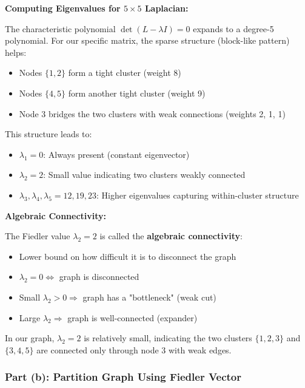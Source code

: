 \documentclass[12pt]{article}
\begin{document}
\begin{explanation}
\textbf{Computing Eigenvalues for $5 \times 5$ Laplacian:}

The characteristic polynomial $\det(L - \lambda I) = 0$ expands to a degree-5 polynomial. For our specific matrix, the sparse structure (block-like pattern) helps:

\begin{itemize}
    \item Nodes $\{1, 2\}$ form a tight cluster (weight 8)
    \item Nodes $\{4, 5\}$ form another tight cluster (weight 9)
    \item Node 3 bridges the two clusters with weak connections (weights 2, 1, 1)
\end{itemize}

This structure leads to:
\begin{itemize}
    \item $\lambda_1 = 0$: Always present (constant eigenvector)
    \item $\lambda_2 = 2$: Small value indicating two clusters weakly connected
    \item $\lambda_3, \lambda_4, \lambda_5 = 12, 19, 23$: Higher eigenvalues capturing within-cluster structure
\end{itemize}

\textbf{Algebraic Connectivity:}

The Fiedler value $\lambda_2 = 2$ is called the \textbf{algebraic connectivity}:
\begin{itemize}
    \item Lower bound on how difficult it is to disconnect the graph
    \item $\lambda_2 = 0 \Leftrightarrow$ graph is disconnected
    \item Small $\lambda_2 > 0 \Rightarrow$ graph has a "bottleneck" (weak cut)
    \item Large $\lambda_2 \Rightarrow$ graph is well-connected (expander)
\end{itemize}

In our graph, $\lambda_2 = 2$ is relatively small, indicating the two clusters $\{1,2,3\}$ and $\{3,4,5\}$ are connected only through node 3 with weak edges.

\end{explanation}

\subsubsection{Part (b): Partition Graph Using Fiedler Vector}
\end{document}
